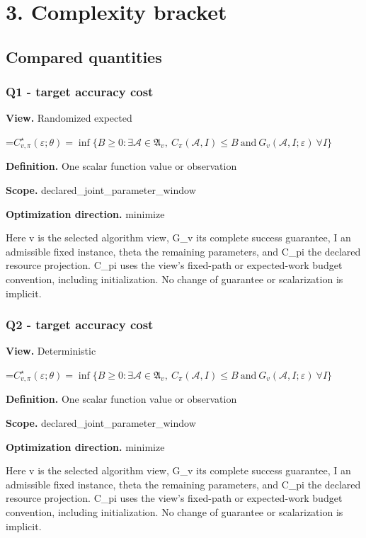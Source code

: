 \documentclass[10pt,a4paper]{article}
\newcommand{\AtlasMath}[1]{\par\begingroup\centering\setbox0=\hbox{$\displaystyle #1$}\ifdim\wd0>1.4\linewidth\typeout{ATLAS WIDE FORMULA: \the\wd0}\fi\ifdim\wd0>\linewidth\resizebox{\linewidth}{!}{\box0}\else\box0\fi\par\endgroup}
\begin{document}
\section{3. Complexity bracket}
\subsection{Compared quantities}
\subsubsection{Q1 - target accuracy cost}
\textbf{View.} Randomized expected

\AtlasMath{C^\star_{v,\pi}(\varepsilon;\theta)=\inf\{B\ge0:\exists\mathcal A\in\mathfrak A_v,\ C_\pi(\mathcal A,I)\le B\ \text{and}\ G_v(\mathcal A,I;\varepsilon)\ \forall I\}}
\textbf{Definition.} One scalar function value or observation

\textbf{Scope.} declared\_joint\_parameter\_window

\textbf{Optimization direction.} minimize

Here v is the selected algorithm view, G\_v its complete success guarantee, I an admissible fixed instance, theta the remaining parameters, and C\_pi the declared resource projection. C\_pi uses the view's fixed-path or expected-work budget convention, including initialization. No change of guarantee or scalarization is implicit.

\subsubsection{Q2 - target accuracy cost}
\textbf{View.} Deterministic

\AtlasMath{C^\star_{v,\pi}(\varepsilon;\theta)=\inf\{B\ge0:\exists\mathcal A\in\mathfrak A_v,\ C_\pi(\mathcal A,I)\le B\ \text{and}\ G_v(\mathcal A,I;\varepsilon)\ \forall I\}}
\textbf{Definition.} One scalar function value or observation

\textbf{Scope.} declared\_joint\_parameter\_window

\textbf{Optimization direction.} minimize

Here v is the selected algorithm view, G\_v its complete success guarantee, I an admissible fixed instance, theta the remaining parameters, and C\_pi the declared resource projection. C\_pi uses the view's fixed-path or expected-work budget convention, including initialization. No change of guarantee or scalarization is implicit.
\end{document}
